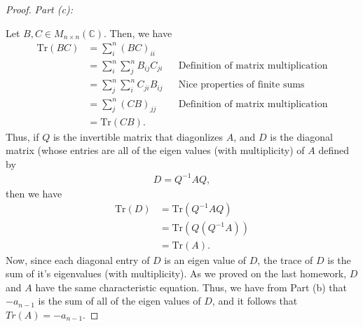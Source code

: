 \documentclass[10pt,a4paper]{article}
\makeatletter
\newcommand{\proofpart}[2]{%
  \par
  \addvspace{\medskipamount}%
  \noindent\emph{Part #1: #2}\par\nobreak
  \addvspace{\smallskipamount}%
  \@afterheading
}
\theoremstyle{definition}
\makeatother
\begin{document}
\begin{proof}
\proofpart{(c)}{} Let $B,C \in M_{n \times n} (\mathbb{C})$. Then, we have
\begin{align*}
\text{Tr}(BC) &= \sum_{i}^n (BC)_{ii}\\
&= \sum_i^n \sum_j^n B_{ij}C_{ji} && \text{Definition of matrix multiplication}\\
&= \sum_j^n \sum_i^n C_{ji}B_{ij} && \text{Nice properties of finite sums}\\
&= \sum_{j}^n (CB)_{jj} && \text{Definition of matrix multiplication}\\
&= \text{Tr}(CB).
\end{align*}
Thus, if $Q$ is the invertible matrix that diagonlizes $A$, and $D$ is the diagonal matrix (whose entries are all of the eigen values (with multiplicity) of $A$ defined by 
\begin{align*}
D = Q^{-1} A Q,
\end{align*}
then we have
\begin{align*}
\text{Tr}(D) &= \text{Tr}(Q^{-1} A Q)\\
&= \text{Tr}(Q(Q^{-1} A ))\\
&= \text{Tr}(A).
\end{align*}
Now, since each diagonal entry of $D$ is an eigen value of $D$, the trace of $D$ is the sum of it's eigenvalues (with multiplicity). As we proved on the last homework, $D$ and $A$ have the same characteristic equation. Thus, we have from Part (b) that $-a_{n-1}$ is the sum of all of the eigen values of $D$, and it follows that $Tr(A) = -a_{n-1}$.
\end{proof}
\end{document}
